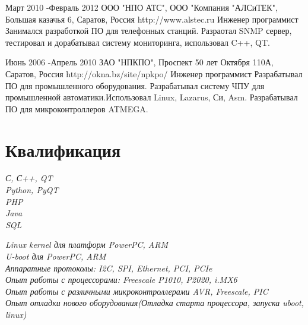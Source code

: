 
\job
{Март 2010 -}{Февраль 2012}
{ООО "НПО АТС", ООО "Компания "АЛСиТЕК", Большая казачья 6, Саратов, Россия}
{http://www.alstec.ru}
{Инженер программист}
{Занимался разработкой ПО для телефонных станций. Разраотал SNMP сервер, тестировал и дорабатывал систему мониторинга, использовал C++, QT.}


\job
{Июнь 2006 -}{Апрель 2010}
{ЗАО "НПКПО", Проспект 50 лет Октября 110А, Саратов, Россия}
{http://okna.bz/site/npkpo/}
{Инженер программист}
{Разрабатывал ПО для промышленного оборудования. Разрабатывал систему ЧПУ для промышленной автоматики.Использовал Linux, Lazarus, Си, Asm. Разрабатывал ПО для микроконтроллеров ATMEGA.}



\section{Квалификация}

{
\textit{С, С++, QT}\\
\textit{Python, PyQT}\\
\textit{PHP}\\
\textit{Java}\\
\textit{SQL}\\
}


{
\textit{Linux kernel для платформ PowerPC, ARM}\\
\textit{U-boot для PowerPC, ARM}\\
\textit{Аппаратные протоколы: I2C, SPI, Ethernet, PCI, PCIe}\\
\textit{Опыт работы с процессорами: Freescale P1010, P2020, i.MX6}\\
\textit{Опыт работы с различными микроконтроллерами AVR, Freescale, PIC}\\
\textit{Опыт отладки нового оборудования(Отладка старта процессора, запуска uboot, linux)}\\
}


